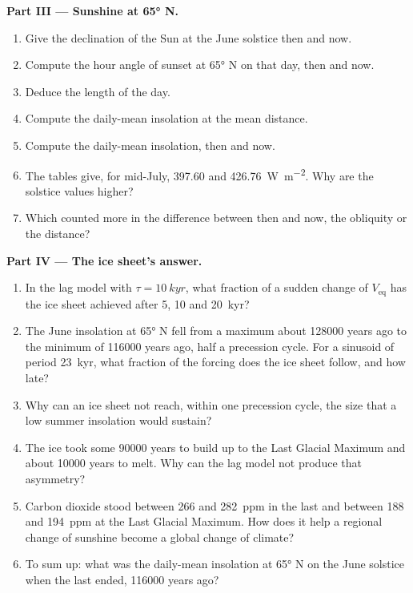 \begin{problem}
\medskip\noindent\textbf{Part III --- Sunshine at \ang{65} N.}
\begin{enumerate}[resume]
  \item Give the declination of the Sun at the June solstice then and now.
  \item Compute the hour angle of sunset at \ang{65} N on that day, then and now.
  \item Deduce the length of the day.
  \item Compute the daily-mean insolation at the mean distance.
  \item Compute the daily-mean insolation, then and now.
  \item The tables give, for mid-July, 397.60 and \qty{426.76}{W.m^{-2}}. Why are the solstice
        values higher?
  \item Which counted more in the difference between then and now, the obliquity or the distance?
\end{enumerate}

\medskip\noindent\textbf{Part IV --- The ice sheet's answer.}
\begin{enumerate}[resume]
  \item In the lag model with $\tau = \qty{10}{kyr}$, what fraction of a sudden change of
        $V_{\mathrm{eq}}$ has the ice sheet achieved after 5, 10 and \qty{20}{kyr}?
  \item The June insolation at \ang{65} N fell from a maximum about \num{128000} years ago to the
        minimum of \num{116000} years ago, half a precession cycle. For a sinusoid of period
        \qty{23}{kyr}, what fraction of the forcing does the ice sheet follow, and how late?
  \item Why can an ice sheet not reach, within one precession cycle, the size that a low summer
        insolation would sustain?
  \item The ice took some \num{90000} years to build up to the Last Glacial Maximum and about
        \num{10000} years to melt. Why can the lag model not produce that asymmetry?
  \item Carbon dioxide stood between 266 and \qty{282}{ppm} in the last  and between
        188 and \qty{194}{ppm} at the Last Glacial Maximum. How does it help a regional change of
        sunshine become a global change of climate?
  \item To sum up: what was the daily-mean insolation at \ang{65} N on the June solstice when the
        last  ended, \num{116000} years ago?
\end{enumerate}
\end{problem}
